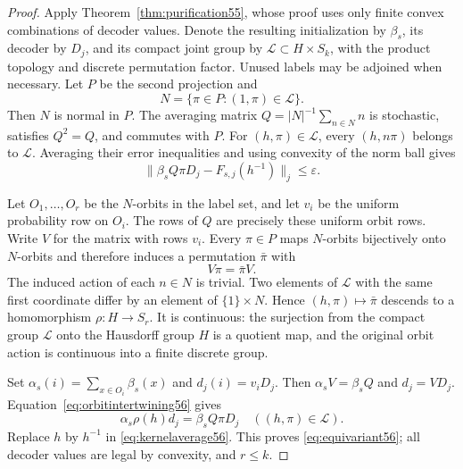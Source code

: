 \begin{proof}
Apply Theorem~\ref{thm:purification55}, whose proof uses only finite convex combinations of decoder values. Denote the resulting initialization by $\beta_s$, its decoder by $D_j$, and its compact joint group by $\mathcal L\subset H\times S_k$, with the product topology and discrete permutation factor. Unused labels may be adjoined when necessary. Let $P$ be the second projection and
\[
                 N=\{\pi\in P:(1,\pi)\in\mathcal L\}.
\]
Then $N$ is normal in $P$. The averaging matrix $Q=|N|^{-1}\sum_{n\in N}n$ is stochastic, satisfies $Q^2=Q$, and commutes with $P$. For $(h,\pi)\in\mathcal L$, every $(h,n\pi)$ belongs to $\mathcal L$. Averaging their error inequalities and using convexity of the norm ball gives
\begin{equation}\label{eq:kernelaverage56}
                   \|\beta_sQ\pi D_j-F_{s,j}(h^{-1})\|_j\le\varepsilon.
\end{equation}

Let $O_1,\ldots,O_r$ be the $N$-orbits in the label set, and let $v_i$ be the uniform probability row on $O_i$. The rows of $Q$ are precisely these uniform orbit rows. Write $V$ for the matrix with rows $v_i$. Every $\pi\in P$ maps $N$-orbits bijectively onto $N$-orbits and therefore induces a permutation $\bar\pi$ with
\begin{equation}\label{eq:orbitintertwining56}
                             V\pi=\bar\pi V.
\end{equation}
The induced action of each $n\in N$ is trivial. Two elements of $\mathcal L$ with the same first coordinate differ by an element of $\{1\}\times N$. Hence $(h,\pi)\mapsto\bar\pi$ descends to a homomorphism $\rho:H\to S_r$. It is continuous: the surjection from the compact group $\mathcal L$ onto the Hausdorff group $H$ is a quotient map, and the original orbit action is continuous into a finite discrete group.

Set $\alpha_s(i)=\sum_{x\in O_i}\beta_s(x)$ and $d_j(i)=v_iD_j$. Then $\alpha_sV=\beta_sQ$ and $d_j=VD_j$. Equation~\eqref{eq:orbitintertwining56} gives
\[
                 \alpha_s\rho(h)d_j=\beta_sQ\pi D_j
                 \quad((h,\pi)\in\mathcal L).
\]
Replace $h$ by $h^{-1}$ in \eqref{eq:kernelaverage56}. This proves \eqref{eq:equivariant56}; all decoder values are legal by convexity, and $r\le k$.
\end{proof}

